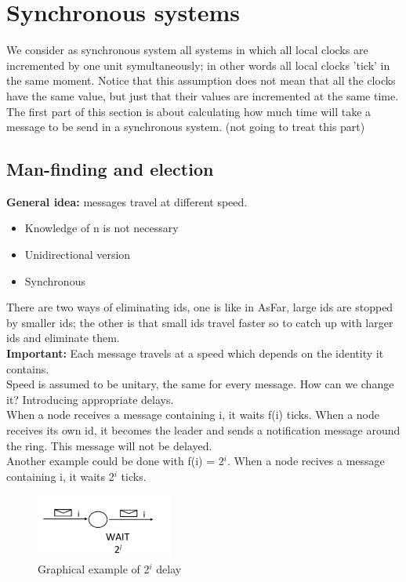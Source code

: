 \documentclass[paper=a4, fontsize=11pt]{scrartcl} %
\numberwithin{equation}{section} %
\numberwithin{figure}{section} %
\numberwithin{table}{section} %
\begin{document}
\section*{Synchronous systems}
We consider as synchronous system all systems in which all local clocks are incremented by one unit symultaneously; in other words all local clocks 'tick' in the same moment. Notice that this assumption does not mean that all the clocks have the same value, but just that their values are incremented at the same time.\\ 
The first part of this section is about calculating how much time will take a message to be send in a synchronous system. (not going to treat this part)
\subsection*{Man-finding and election}
\textbf{General idea:} messages travel at different speed.
\begin{itemize}
\item Knowledge of n is not necessary
\item Unidirectional version
\item Synchronous
\end{itemize}
There are two ways of eliminating ids, one is like in AsFar, large ids are stopped by smaller ids; the other is that small ids travel faster so to catch up with larger ids and eliminate them. \\
\textbf{Important:} Each message travels at a speed which depends on the identity it contains.\\ 
Speed is assumed to be unitary, the same for every message. How can we change it? Introducing appropriate delays.\\
When a node receives a message containing i, it waits f(i) ticks. When a node receives its own id, it becomes the leader and sends a notification message around the ring. This message will not be delayed.\\
Another example could be done with f(i) = 2$^i$. When a node recives a message containing i, it waits 2$^i$ ticks. 
\begin{figure}[H]
  \centering
  \includegraphics[width=0.4\textwidth]{img/fi.png}
  \caption{Graphical example of 2$^i$ delay}
  \label{fig:boat1}
\end{figure}
\end{document}
